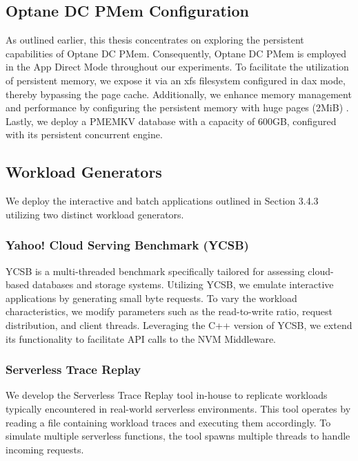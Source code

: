 \subsection{Optane DC PMem Configuration}
As outlined earlier, this thesis concentrates on exploring the persistent capabilities of Optane DC PMem. Consequently, Optane DC PMem is employed in the App Direct Mode throughout our experiments. To facilitate the utilization of persistent memory, we expose it via an xfs filesystem configured in dax mode, thereby bypassing the page cache. Additionally, we enhance memory management and performance by configuring the persistent memory with huge pages (2MiB) \cite{Speeding28:online}. Lastly, we deploy a PMEMKV database with a capacity of 600GB, configured with its persistent concurrent engine.

\subsection{Workload Generators}

We deploy the interactive and batch applications outlined in Section 3.4.3 utilizing two distinct workload generators.

\subsubsection{Yahoo! Cloud Serving Benchmark (YCSB)}

YCSB \cite{GitHubba9:online} is a multi-threaded benchmark specifically tailored for assessing cloud-based databases and storage systems. Utilizing YCSB, we emulate interactive applications by generating small byte requests. To vary the workload characteristics, we modify parameters such as the read-to-write ratio, request distribution, and client threads. Leveraging the C++ version of YCSB, we extend its functionality to facilitate API calls to the NVM Middleware.

\subsubsection{Serverless Trace Replay}

We develop the Serverless Trace Replay tool in-house to replicate workloads typically encountered in real-world serverless environments. This tool operates by reading a file containing workload traces and executing them accordingly. To simulate multiple serverless functions, the tool spawns multiple threads to handle incoming requests.

